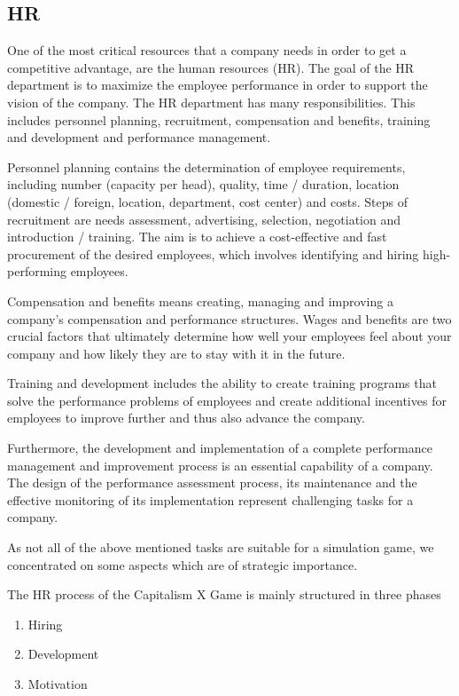 \subsection{HR} 
\label{HR_manual}
One of the most critical resources that a company needs in order to get a competitive advantage, are the human resources (HR).
The goal of the HR department is to maximize the employee performance in order to support the vision of the company. The HR department has many responsibilities. This includes personnel planning, recruitment, compensation and benefits, training and development and performance management.

Personnel planning contains the determination of employee requirements, including number (capacity per head), quality, time / duration, location (domestic / foreign, location, department, cost center) and costs. Steps of recruitment are needs assessment, advertising, selection, negotiation and introduction / training. The aim is to achieve a cost-effective and fast procurement of the desired employees, which involves identifying and hiring high-performing employees. 

Compensation and benefits means creating, managing and improving a company's compensation and performance structures. Wages and benefits are two crucial factors that ultimately determine how well your employees feel about your company and how likely they are to stay with it in the future.

Training and development includes the ability to create training programs that solve the performance problems of employees and create additional incentives for employees to improve further and thus also advance the company.

Furthermore, the development and implementation of a complete performance management and improvement process is an essential capability of a company. The design of the performance assessment process, its maintenance and the effective monitoring of its implementation represent challenging tasks for a company. 

As not all of the above mentioned tasks are suitable for a simulation game, we concentrated on some aspects which are of strategic importance.

The HR process of the Capitalism X Game is mainly structured in three phases
\begin{enumerate}
    \item Hiring
    \item Development
    \item Motivation
\end{enumerate}

